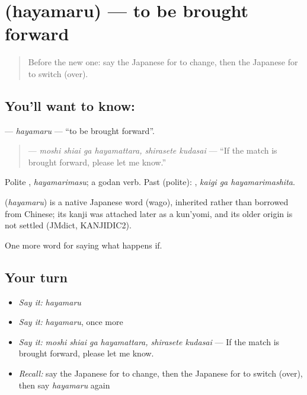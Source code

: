 \section[\texorpdfstring{\ja{はやまる} (hayamaru)}{はやまる (hayamaru)}]{ (hayamaru) — to be brought forward}

\label{lesson:JA-C512-hayamaru}



\begin{quote}
Before the new one: say the Japanese for to change, then the Japanese for to switch (over).
\end{quote}

\subsection*{You'll want to know: }
\textbf{} — \emph{hayamaru} — \textquotedblleft{}to be brought forward\textquotedblright{}.

\begin{quote}
\textbf{   } — \emph{moshi shiai ga hayamattara, shirasete kudasai} — \textquotedblleft{}If the match is brought forward, please let me know.\textquotedblright{}
\end{quote}

Polite \textbf{}, \emph{hayamarimasu}; a godan verb. Past (polite): \textbf{ }, \emph{kaigi ga hayamarimashita}.

\begin{cousinweb}
\textbf{} (\emph{hayamaru}) is a native Japanese word (wago), inherited rather than borrowed from Chinese; its kanji was attached later as a kun'yomi, and its older origin is not settled (JMdict, KANJIDIC2).
\end{cousinweb}

\begin{grammarlens}[title={What you've built}]
One more word for saying what happens if.
\end{grammarlens}

\subsection*{Your turn}
\begin{itemize}
\raggedright
  \item \emph{Say it:} \emph{hayamaru}
  \item \emph{Say it:} \emph{hayamaru}, once more
  \item \emph{Say it:} \emph{moshi shiai ga hayamattara, shirasete kudasai} — If the match is brought forward, please let me know.
  \item \emph{Recall:} say the Japanese for to change, then the Japanese for to switch (over), then say \emph{hayamaru} again
\end{itemize}

